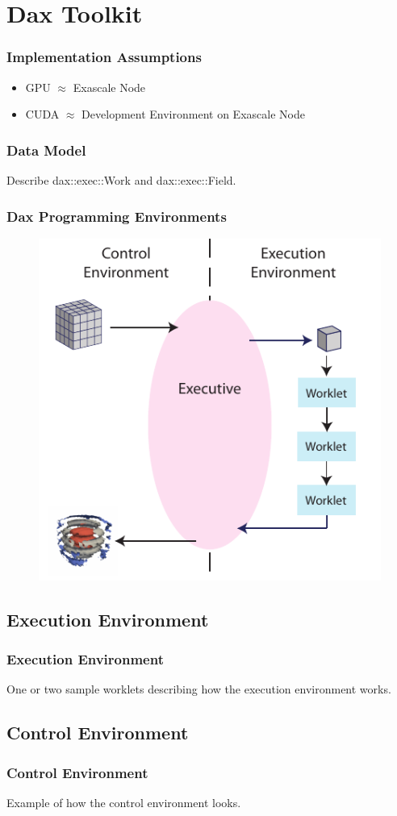 \documentclass[brown]{beamer}
\begin{document}
\section{Dax Toolkit}

\frame
{
  \frametitle{Implementation Assumptions}
  \begin{itemize}
  \item GPU $\approx$ Exascale Node
  \item CUDA $\approx$ Development Environment on Exascale Node
  \end{itemize}
}

\frame
{
  \frametitle{Data Model}
  Describe dax::exec::Work and dax::exec::Field.
}

\frame
{
  \frametitle{Dax Programming Environments}
  \begin{figure}[htbp]
    \centering
    \includegraphics{images/DaxDiagram}
  \end{figure}
}

\subsection{Execution Environment}
\frame
{
  \frametitle{Execution Environment}
  One or two sample worklets describing how the execution environment works.
}

\subsection{Control Environment}
\frame
{
  \frametitle{Control Environment}
  Example of how the control environment looks.
}
\end{document}
